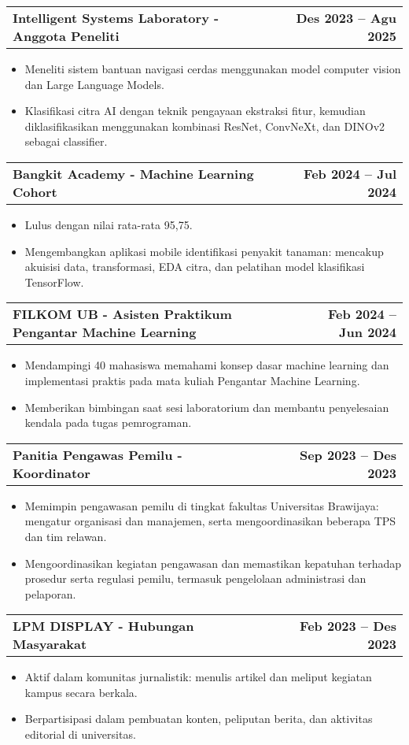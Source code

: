 \documentclass[a4paper,12pt]{article}
\makeatletter
\newenvironment{joblong}[2]
    {
    \begin{tabularx}{\linewidth}{@{}l X r@{}}
    \textbf{#1} & \hfill &  #2 \\[3.75pt]
    \end{tabularx}
    \begin{minipage}[t]{\linewidth}
    \begin{itemize}[nosep,after=\strut, leftmargin=1em, itemsep=3pt,label=--]
    }
    {
    \end{itemize}
    \end{minipage}    
    }
\makeatother
\begin{document}
\begin{joblong}{Intelligent Systems Laboratory - Anggota Peneliti}{\textbf{Des 2023 -- Agu 2025}}
\item Meneliti sistem bantuan navigasi cerdas menggunakan model computer vision dan Large Language Models.
\item Klasifikasi citra AI dengan teknik pengayaan ekstraksi fitur, kemudian diklasifikasikan menggunakan kombinasi ResNet, ConvNeXt, dan DINOv2 sebagai classifier.
\end{joblong}

\begin{joblong}{Bangkit Academy - Machine Learning Cohort}{\textbf{Feb 2024 -- Jul 2024}}
\item Lulus dengan nilai rata-rata 95{,}75.
\item Mengembangkan aplikasi mobile identifikasi penyakit tanaman: mencakup akuisisi data, transformasi, EDA citra, dan pelatihan model klasifikasi TensorFlow.
\end{joblong}

\begin{joblong}{FILKOM UB - Asisten Praktikum Pengantar Machine Learning}{\textbf{Feb 2024 -- Jun 2024}}
\item Mendampingi 40 mahasiswa memahami konsep dasar machine learning dan implementasi praktis pada mata kuliah Pengantar Machine Learning.
\item Memberikan bimbingan saat sesi laboratorium dan membantu penyelesaian kendala pada tugas pemrograman.
\end{joblong}

\begin{joblong}{Panitia Pengawas Pemilu - Koordinator }{\textbf{Sep 2023 -- Des 2023}}
\item Memimpin pengawasan pemilu di tingkat fakultas Universitas Brawijaya: mengatur organisasi dan manajemen, serta mengoordinasikan beberapa TPS dan tim relawan.
\item Mengoordinasikan kegiatan pengawasan dan memastikan kepatuhan terhadap prosedur serta regulasi pemilu, termasuk pengelolaan administrasi dan pelaporan.
\end{joblong}

\begin{joblong}{LPM DISPLAY - Hubungan Masyarakat}{\textbf{Feb 2023 -- Des 2023}}
\item Aktif dalam komunitas jurnalistik: menulis artikel dan meliput kegiatan kampus secara berkala.
\item Berpartisipasi dalam pembuatan konten, peliputan berita, dan aktivitas editorial di universitas.
\end{joblong}
\end{document}
